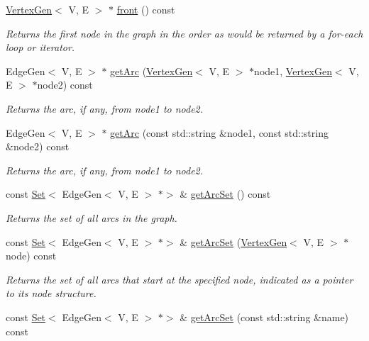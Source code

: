 \begin{DoxyCompactItemize}
\mbox{\hyperlink{classVertexGen}{Vertex\+Gen}}$<$ V, E $>$ $\ast$ \mbox{\hyperlink{classGraph_a7b7c2c1738f8e7faf84c54d7642992fa}{front}} () const
\begin{DoxyCompactList}\small\item\em Returns the first node in the graph in the order as would be returned by a for-\/each loop or iterator. \end{DoxyCompactList}\item 
Edge\+Gen$<$ V, E $>$ $\ast$ \mbox{\hyperlink{classGraph_a7c33db338f839ff9e3dafe4fe61c16fd}{get\+Arc}} (\mbox{\hyperlink{classVertexGen}{Vertex\+Gen}}$<$ V, E $>$ $\ast$node1, \mbox{\hyperlink{classVertexGen}{Vertex\+Gen}}$<$ V, E $>$ $\ast$node2) const
\begin{DoxyCompactList}\small\item\em Returns the arc, if any, from node1 to node2. \end{DoxyCompactList}\item 
Edge\+Gen$<$ V, E $>$ $\ast$ \mbox{\hyperlink{classGraph_a94d4badfc856b0d4530c37121efb9834}{get\+Arc}} (const std\+::string \&node1, const std\+::string \&node2) const
\begin{DoxyCompactList}\small\item\em Returns the arc, if any, from node1 to node2. \end{DoxyCompactList}\item 
const \mbox{\hyperlink{classstanfordcpplib_1_1collections_1_1GenericSet}{Set}}$<$ Edge\+Gen$<$ V, E $>$ $\ast$$>$ \& \mbox{\hyperlink{classGraph_a0690edaeae8d5256189ae2e8541788b5}{get\+Arc\+Set}} () const
\begin{DoxyCompactList}\small\item\em Returns the set of all arcs in the graph. \end{DoxyCompactList}\item 
const \mbox{\hyperlink{classstanfordcpplib_1_1collections_1_1GenericSet}{Set}}$<$ Edge\+Gen$<$ V, E $>$ $\ast$$>$ \& \mbox{\hyperlink{classGraph_a17cfc7f4d8c738fc6f51813f50be6400}{get\+Arc\+Set}} (\mbox{\hyperlink{classVertexGen}{Vertex\+Gen}}$<$ V, E $>$ $\ast$node) const
\begin{DoxyCompactList}\small\item\em Returns the set of all arcs that start at the specified node, indicated as a pointer to its node structure. \end{DoxyCompactList}\item 
const \mbox{\hyperlink{classstanfordcpplib_1_1collections_1_1GenericSet}{Set}}$<$ Edge\+Gen$<$ V, E $>$ $\ast$$>$ \& \mbox{\hyperlink{classGraph_a31b9e2056ee2d66a7ea9feb02f016e8d}{get\+Arc\+Set}} (const std\+::string \&name) const
$$
\end{DoxyCompactItemize}
